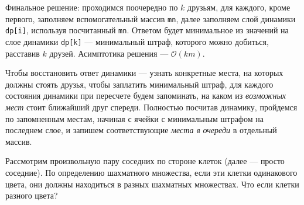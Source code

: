 \documentclass[12pt]{article}
\theoremstyle{definition}
\begin{document}
Финальное решение: проходимся поочередно по $k$ друзьям, для каждого, кроме первого, заполняем вспомогательный массив \texttt{mn}, далее заполняем слой динамики \texttt{dp[i]}, используя посчитанный \texttt{mn}. Ответом будет минимальное из значений на слое динамики \texttt{dp[k]} --- минимальный штраф, которого можно добиться, расставив $k$ друзей. Асимптотика решения --- $\mathcal{O}(km)$.

Чтобы восстановить ответ динамики --- узнать конкретные места, на которых должны стоять друзья, чтобы заплатить минимальный штраф, для каждого состояния динамики при пересчете будем запоминать, на каком из \textit{возможных мест} стоит ближайший друг спереди. Полностью посчитав динамику, пройдемся по запомненным местам, начиная с ячейки с минимальным штрафом на последнем слое, и запишем соответствующие \textit{места в очереди} в отдельный массив.

\pagebreak


Рассмотрим произвольную пару соседних по стороне клеток (далее --- просто соседние). По определению шахматного множества, если эти клетки одинакового цвета, они должны находиться в разных шахматных множествах. Что если клетки разного цвета? 
\end{document}
